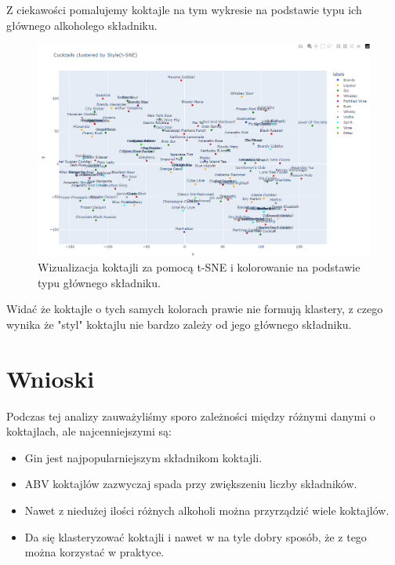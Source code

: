 \documentclass{article}
\begin{document}
\clearpage

Z ciekawości pomalujemy koktajle na tym wykresie na podstawie typu ich głównego alkoholego składniku.

\begin{figure}[h]
\centering
    \includegraphics[width=1\linewidth]{cluster_7.png}
    \caption{Wizualizacja koktajli za pomocą t-SNE i kolorowanie na podstawie typu głównego składniku.}
\end{figure}


Widać że koktajle o tych samych kolorach prawie nie formują klastery, z czego wynika że "styl" koktajlu nie bardzo zależy od jego głównego składniku.


\section{Wnioski}
Podczas tej analizy zauważyliśmy sporo zależności między różnymi danymi o koktajlach, ale najcenniejszymi są:
\begin{itemize}
    \item Gin jest najpopularniejszym składnikom koktajli.
    \item ABV koktajlów zazwyczaj spada przy zwiększeniu liczby składników.
    \item Nawet z niedużej ilości różnych alkoholi można przyrządzić wiele koktajlów.
    \item Da się klasteryzować koktajli i nawet w na tyle dobry sposób, że z tego można korzystać w praktyce.
\end{itemize}
\end{document}
